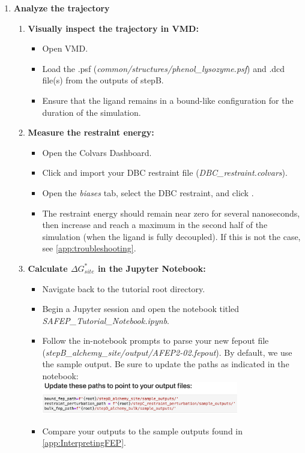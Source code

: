 \documentclass[9pt,tutorial]{Styling/livecoms}
\newcommand{\filepath}[1]{\textit{#1}}
\newcommand{\button}[1]{
  \inlineBox[gray]{\texttt{#1}}
}
\newcommand{\menu}[1]{
  \textit{#1}
}
\begin{document}
\begin{enumerate}
    \item \textbf{Analyze the trajectory}

    
    \begin{enumerate}[label=\alph*., ref=\theenumi.\alph*] \label{step:analyzeSite}
        \item \textbf{Visually inspect the trajectory in VMD:}
        \begin{itemize}
            \item Open VMD.
            \item Load the .psf (\filepath{common/structures/phenol\_lysozyme.psf}) and .dcd file(s) from the outputs of stepB.
            \item Ensure that the ligand remains in a bound-like configuration for the duration of the simulation.
        \end{itemize}
        \item \textbf{Measure the restraint energy:} 
        \begin{itemize}
            \item Open the Colvars Dashboard.
            \item Click \button{Load} and import your DBC restraint file (\filepath{DBC\_restraint.colvars}).
            \item Open the \menu{biases} tab, select the DBC restraint, and click \button{Energy Timeline}.
            \item The restraint energy should remain near zero for several nanoseconds, then increase and reach a maximum in the second half of the simulation (when the ligand is fully decoupled). If this is not the case, see \ref{app:troubleshooting}.
        \end{itemize}
        \item \textbf{Calculate $\Delta G^*_{site}$ in the Jupyter Notebook:} \label{step:opennotebook}
        \begin{itemize}
            \item Navigate back to the tutorial root directory.
            \item Begin a Jupyter session and open the notebook titled \filepath{SAFEP\_Tutorial\_Notebook.ipynb}.
            \item Follow the in-notebook prompts to parse your new fepout file  (\filepath{stepB\_alchemy\_site/output/AFEP2-02.fepout}). By default, we use the sample output. Be sure to update the paths as indicated in the notebook:\\ \includegraphics[width=0.75\textwidth, trim={0 0 0 2cm},clip]{update_paths.png}
            \label{fig:updatePaths}
            \item Compare your outputs to the sample outputs found in \ref{app:InterpretingFEP}.
        \end{itemize}
    \end{enumerate}
\end{enumerate}
\end{document}
